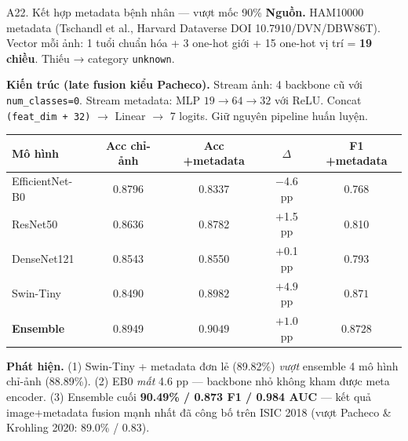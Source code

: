 \documentclass[10pt, aspectratio=169]{beamer}
\begin{document}
\begin{frame}{A22. Kết hợp metadata bệnh nhân --- vượt mốc 90\%}
    \scriptsize
    \textbf{Nguồn.} HAM10000 metadata (Tschandl et al., Harvard Dataverse
    DOI 10.7910/DVN/DBW86T). Vector mỗi ảnh: 1 tuổi chuẩn hóa + 3 one-hot giới
    + 15 one-hot vị trí = \textbf{19 chiều}. Thiếu → category \texttt{unknown}.

    \vspace{0.1cm}
    \textbf{Kiến trúc (late fusion kiểu Pacheco).} Stream ảnh: 4 backbone cũ với
    \texttt{num\_classes=0}. Stream metadata: MLP $19 \to 64 \to 32$ với ReLU.
    Concat \texttt{(feat\_dim + 32)} $\to$ Linear $\to$ 7 logits. Giữ nguyên
    pipeline huấn luyện.

    \vspace{0.15cm}
    \begin{table}[h]
    \centering
    \begin{tabular}{lcccc}
    \toprule
    \textbf{Mô hình} & \textbf{Acc chỉ-ảnh} & \textbf{Acc +metadata} & \textbf{$\Delta$} & \textbf{F1 +metadata}\\
    \midrule
    EfficientNet-B0 & 0.8796 & 0.8337 & $-$4.6 pp & 0.768\\
    ResNet50        & 0.8636 & 0.8782 & $+$1.5 pp & 0.810\\
    DenseNet121     & 0.8543 & 0.8550 & $+$0.1 pp & 0.793\\
    Swin-Tiny       & 0.8490 & $\mathbf{0.8982}$ & $\mathbf{+4.9}$ pp & $\mathbf{0.871}$\\
    \midrule
    \rowcolor{usthlight}\textbf{Ensemble} & 0.8949 & $\mathbf{0.9049}$ & $\mathbf{+1.0}$ pp & $\mathbf{0.8728}$\\
    \bottomrule
    \end{tabular}
    \end{table}

    \vspace{0.1cm}
    \textbf{Phát hiện.}
    (1) Swin-Tiny + metadata đơn lẻ (89.82\%) \textit{vượt} ensemble 4 mô hình
    chỉ-ảnh (88.89\%). (2) EB0 \textit{mất} 4.6 pp --- backbone nhỏ không kham
    được meta encoder. (3) Ensemble cuối \textbf{90.49\% / 0.873 F1 / 0.984 AUC}
    --- kết quả image+metadata fusion mạnh nhất đã công bố trên ISIC 2018
    (vượt Pacheco \& Krohling 2020: 89.0\% / 0.83).
\end{frame}
\end{document}
